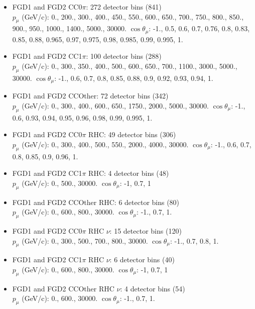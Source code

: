 \begin{itemize}
  \item FGD1 and FGD2 CC0$\pi$: 272 detector bins (841) \\
    $p_\mu$ (GeV/c): 0., 200., 300., 400., 450., 550., 600., 650., 700., 750., 800., 850., 900., 950., 1000., 1400., 5000., 30000.
    $\cos\theta_\mu$: -1., 0.5, 0.6, 0.7, 0.76, 0.8, 0.83, 0.85, 0.88, 0.965, 0.97, 0.975, 0.98, 0.985, 0.99, 0.995, 1.

  \item FGD1 and FGD2 CC1$\pi$: 100 detector bins (288) \\
    $p_\mu$ (GeV/c): 0., 300., 350., 400., 500., 600., 650., 700., 1100., 3000., 5000., 30000.
    $\cos\theta_\mu$: -1., 0.6, 0.7, 0.8, 0.85, 0.88, 0.9, 0.92, 0.93, 0.94, 1.

  \item FGD1 and FGD2 CCOther: 72 detector bins (342) \\
    $p_\mu$ (GeV/c): 0., 300., 400., 600., 650., 1750., 2000., 5000., 30000.
    $\cos\theta_\mu$: -1., 0.6, 0.93, 0.94, 0.95, 0.96, 0.98, 0.99, 0.995, 1.

  \item FGD1 and FGD2 CC0$\pi$ RHC: 49 detector bins (306) \\
    $p_\mu$ (GeV/c): 0., 300., 400., 500., 550., 2000., 4000., 30000.
    $\cos\theta_\mu$: -1., 0.6, 0.7, 0.8, 0.85, 0.9, 0.96, 1. 
    
  \item FGD1 and FGD2 CC1$\pi$ RHC: 4 detector bins (48) \\
    $p_\mu$ (GeV/c): 0., 500., 30000.
    $\cos\theta_\mu$: -1, 0.7, 1

  \item FGD1 and FGD2 CCOther RHC: 6 detector bins (80) \\
    $p_\mu$ (GeV/c): 0., 600., 800., 30000.
    $\cos\theta_\mu$: -1., 0.7, 1.

  \item FGD1 and FGD2 CC0$\pi$ RHC $\nu$: 15 detector bins (120) \\
    $p_\mu$ (GeV/c): 0., 300., 500., 700., 800., 30000.
    $\cos\theta_\mu$: -1., 0.7, 0.8, 1.

  \item FGD1 and FGD2 CC1$\pi$ RHC $\nu$: 6 detector bins (40) \\
    $p_\mu$ (GeV/c): 0., 600., 800., 30000.
    $\cos\theta_\mu$: -1, 0.7, 1

  \item FGD1 and FGD2 CCOther RHC $\nu$: 4 detector bins (54)\\
    $p_\mu$ (GeV/c): 0., 600., 30000.
    $\cos\theta_\mu$: -1., 0.7, 1.
\end{itemize}

